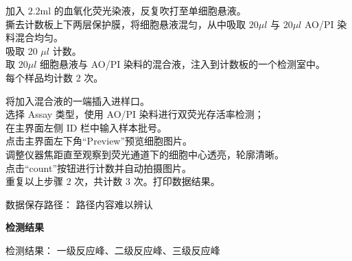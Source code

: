 \documentclass[UTF8,10pt,a4paper,fontset=fandol]{ctexart}
\newcommand{\fieldvalue}[1]{#1}
\newcommand{\handwritten}[1]{#1}
\begin{document}
\vspace{0.5em}

\noindent
加入 $2.2\mathrm{ml}$ 的血氧化荧光染液，反复吹打至单细胞悬液。\\
撕去计数板上下两层保护膜，将细胞悬液混匀，从中吸取 $20\mu l$ 与 $20\mu l$ AO/PI 染料混合均匀。\\
吸取
\fieldvalue{\handwritten{20}}
$\mu l$ 计数。\\
取 $20\mu l$ 细胞悬液与 AO/PI 染料的混合液，注入到计数板的一个检测室中。\\
每个样品均计数
\fieldvalue{\handwritten{2}}
次。

\vspace{0.5em}

将加入混合液的一端插入进样口。\\
选择 Assay 类型，使用 AO/PI 染料进行双荧光存活率检测；\\
在主界面左侧 ID 栏中输入样本批号。\\
点击主界面左下角“Preview”预览细胞图片。\\
调整仪器焦距直至观察到荧光通道下的细胞中心透亮，轮廓清晰。\\
点击“count”按钮进行计数并自动拍摄图片。\\
重复以上步骤 2 次，共计数 3 次。打印数据结果。

\vspace{0.5em}

\noindent
数据保存路径：
\handwritten{路径内容难以辨认}

\begin{center}
\textbf{检测结果}
\end{center}

\noindent
检测结果：
\fieldvalue{\handwritten{\checkmark}}
 一级反应峰、二级反应峰、三级反应峰
\end{document}
